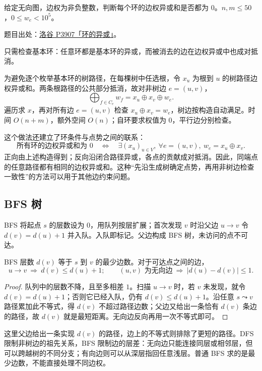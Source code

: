 \begin{exercise}[P3907 环的异或]
    给定无向图，边权为非负整数，判断每个环的边权异或和是否都为 $0$。$n,m\le 50$，$0\le w_e<10^5$。
\end{exercise}
\noindent 题目出处：\href{https://www.luogu.com.cn/problem/P3907}{洛谷 P3907「环的异或」}。
\begin{solution}
    只需检查基本环：任意环都是基本环的异或，而被消去的边在边权异或中也成对抵消。

    为避免逐个枚举基本环的树路径，在每棵树中任选根，令 $x_u$ 为根到 $u$ 的树路径边权异或和。两条根路径的公共部分抵消，故对非树边 $e=(u,v)$，
    \[
        \bigoplus_{f\in C_e}w_f=x_u\oplus x_v\oplus w_e.
    \]
    遍历求 $x$，再对所有边 $e=(u,v)$ 检查 $x_u\oplus x_v=w_e$，树边按构造自动满足。时间 $O(n+m)$，额外空间 $O(n)$；自环要求权值为 $0$，平行边分别检查。
\end{solution}

这个做法还建立了环条件与点势之间的联系：
\[
    \text{所有环的边权异或和为 }0
    \quad\Longleftrightarrow\quad
    \exists(x_u)_{u\in V},\ \forall e=(u,v),\ w_e=x_u\oplus x_v.
\]
正向由上述构造得到；反向沿闭合路径异或，各点的贡献成对抵消。因此，同端点的任意路径都有相同的边权异或和。这种“先沿生成树确定点势，再用非树边检查一致性”的方法可以用于其他边约束问题。

\subsection{BFS 树}

BFS 将起点 $s$ 的层数设为 $0$，用队列按层扩展；首次发现 $v$ 时沿父边 $u\to v$ 令 $d(v)=d(u)+1$ 并入队。入队即标记。父边构成 BFS 树，未访问的点不可达。

\begin{theorem}[距离分层]
    BFS 层数 $d(v)$ 等于 $s$ 到 $v$ 的最少边数。对于可达点之间的边，
    \[
        u\to v\ \Longrightarrow\ d(v)\le d(u)+1;
        \qquad
        (u,v)\text{ 为无向边}\ \Longrightarrow\ |d(u)-d(v)|\le 1.
    \]
\end{theorem}
\begin{proof}
    队列中的层数不降，且至多相差 $1$。扫描 $u\to v$ 时，若 $v$ 未发现，就令 $d(v)=d(u)+1$；否则它已经入队，仍有 $d(v)\le d(u)+1$。沿任意 $s\leadsto v$ 路径累加此不等式，得 $d(v)$ 不超过路径边数；父边又给出一条恰有 $d(v)$ 条边的路径，故 $d(v)$ 就是最短距离。无向边反向再用一次不等式即可。
\end{proof}

这里父边给出一条实现 $d(v)$ 的路径，边上的不等式则排除了更短的路径。DFS 限制非树边的祖先关系，BFS 限制边的层差：无向边只能连接同层或相邻层，但可以跨越树的不同分支；有向边则可以从深层指回任意浅层。普通 BFS 求的是最少边数，不能直接处理不同边权。

